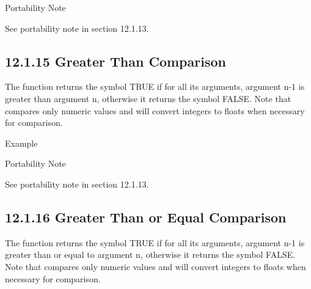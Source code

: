\documentclass[letterpaper,10pt,english]{sphinxmanual}
\begin{document}
Portability Note

See portability note in section 12.1.13.


\subsection{12.1.15 Greater Than Comparison}
\label{\detokenize{actions:greater-than-comparison}}
The \sphinxstylestrong{\textgreater{}} function returns the symbol TRUE if for all its arguments,
argument n-1 is greater than argument n, otherwise it returns the symbol
FALSE. Note that \sphinxstylestrong{\textgreater{}} compares only numeric values and will convert
integers to floats when necessary for comparison.


\begin{sphinxVerbatim}[commandchars=\\\{\}]
  
\end{sphinxVerbatim}

Example

\begin{sphinxVerbatim}[commandchars=\\\{\}]
    
    
\end{sphinxVerbatim}

Portability Note

See portability note in section 12.1.13.


\subsection{12.1.16 Greater Than or Equal Comparison}
\label{\detokenize{actions:greater-than-or-equal-comparison}}
The \sphinxstylestrong{\textgreater{}=} function returns the symbol TRUE if for all its arguments,
argument n-1 is greater than or equal to argument n, otherwise it
returns the symbol FALSE. Note that \sphinxstylestrong{\textgreater{}=} compares only numeric values
and will convert integers to floats when necessary for comparison.
\end{document}
